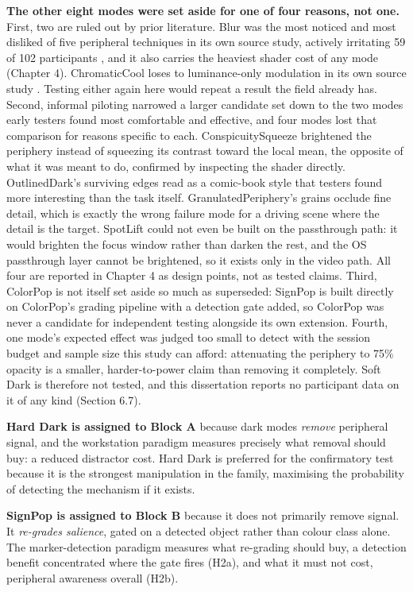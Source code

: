 \textbf{The other eight modes were set aside for one of four reasons, not one.} First, two are ruled
out by prior literature. Blur was the most noticed and most disliked of five peripheral techniques in
its own source study, actively irritating 59 of 102 participants \citep{grogorick2018}, and it also
carries the heaviest shader cost of any mode (Chapter 4). ChromaticCool loses to luminance-only
modulation in its own source study \citep{bailey2009}. Testing either again here would repeat a
result the field already has. Second, informal piloting narrowed a larger candidate set down to the
two modes early testers found most comfortable and effective, and four modes lost that comparison for
reasons specific to each. ConspicuitySqueeze brightened the periphery instead of squeezing its
contrast toward the local mean, the opposite of what it was meant to do, confirmed by inspecting the
shader directly. OutlinedDark's surviving edges read as a comic-book style that testers found more
interesting than the task itself. GranulatedPeriphery's grains occlude fine detail, which is exactly
the wrong failure mode for a driving scene where the detail is the target. SpotLift could not even be
built on the passthrough path: it would brighten the focus window rather than darken the rest, and the
OS passthrough layer cannot be brightened, so it exists only in the video path. All four are reported
in Chapter 4 as design points, not as tested claims. Third, ColorPop is
not itself set aside so much as superseded: SignPop is built directly
on ColorPop's grading pipeline with a detection gate added, so ColorPop was never a candidate for
independent testing alongside its own extension. Fourth, one mode's expected effect was judged too
small to detect with the session budget and sample size this study can afford: attenuating the
periphery to 75\% opacity is a smaller, harder-to-power claim than removing it completely. Soft Dark
is therefore not tested, and this dissertation reports no participant data on it of any kind
(Section 6.7).

\textbf{Hard Dark is assigned to Block A} because dark modes \textit{remove} peripheral signal, and the
workstation paradigm measures precisely what removal should buy: a reduced distractor cost. Hard Dark
is preferred for the confirmatory test because it is the strongest manipulation in the family,
maximising the probability of detecting the mechanism if it exists.

\textbf{SignPop is assigned to Block B} because it does not primarily remove signal. It \textit{re-grades
salience}, gated on a detected object rather than colour class alone. The marker-detection paradigm
measures what re-grading should buy, a detection benefit concentrated where the gate fires (H2a), and
what it must not cost, peripheral awareness overall (H2b).

